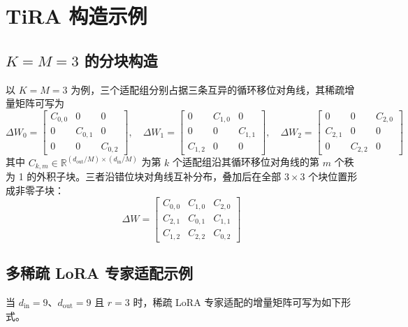 ﻿\documentclass[UTF8,a4paper,11pt]{ctexart}
\newcommand{\R}{\mathbb{R}}
\newcommand{\DeltaW}{\Delta W}
\begin{document}
\appendix

\section{TiRA 构造示例}

\subsection{$K=M=3$ 的分块构造}
\label{app:k3m3}

以 $K=M=3$ 为例，三个适配组分别占据三条互异的循环移位对角线，其稀疏增量矩阵可写为
\begin{equation}
\Delta W_0=
\begin{bmatrix}
C_{0,0} & 0 & 0\\
0 & C_{0,1} & 0\\
0 & 0 & C_{0,2}
\end{bmatrix},\quad
\Delta W_1=
\begin{bmatrix}
0 & C_{1,0} & 0\\
0 & 0 & C_{1,1}\\
C_{1,2} & 0 & 0
\end{bmatrix},\quad
\Delta W_2=
\begin{bmatrix}
0 & 0 & C_{2,0}\\
C_{2,1} & 0 & 0\\
0 & C_{2,2} & 0
\end{bmatrix}
\end{equation}
其中 $C_{k,m}\in\R^{(d_{\mathrm{out}}/M)\times(d_{\mathrm{in}}/M)}$ 为第 $k$ 个适配组沿其循环移位对角线的第 $m$ 个秩为 1 的外积子块。三者沿错位块对角线互补分布，叠加后在全部 $3\times3$ 个块位置形成非零子块：
\begin{equation}
\DeltaW=
\begin{bmatrix}
C_{0,0} & C_{1,0} & C_{2,0}\\
C_{2,1} & C_{0,1} & C_{1,1}\\
C_{1,2} & C_{2,2} & C_{0,2}
\end{bmatrix}
\end{equation}

\subsection{多稀疏 LoRA 专家适配示例}
\label{app:sparse_expert}

当 $d_{\mathrm{in}}=9$、$d_{\mathrm{out}}=9$ 且 $r=3$ 时，稀疏 LoRA 专家适配的增量矩阵可写为如下形式。
\end{document}
